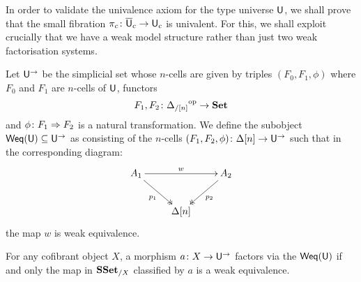 \documentclass[reqno,10pt,a4paper,oneside,draft]{amsart}
\begin{document}
In order to validate the univalence axiom for the type universe $\mathsf{U}$, we shall prove that the small fibration 
$\pi_c \colon \overline{\mathsf{U}}_c \to \mathsf{U}_c$ is univalent. For this, we shall exploit crucially that we have a weak model
structure rather than just two weak factorisation systems.






 Let $\mathsf{U}^{\rightarrow}$ be the simplicial set whose $n$-cells are given by triples $(F_0, F_1, \phi)$ where
 $F_0$ and $F_1$ are $n$-cells of $\mathsf{U}$, \ie functors
 \[
F_1, F_2 \colon {\Delta_{/[n]}}^{\operatorname{op}} \rightarrow \mathbf{Set}
\]
and $\phi \colon F_1 \Rightarrow F_2$ is a natural transformation. We define the subobject $\mathsf{Weq}(\mathsf{U}) \subseteq \mathsf{U}^{\rightarrow}$ as consisting of the 
$n$-cells $(F_1, F_2, \phi) \colon \Delta[n] \rightarrow \mathsf{U}^{\rightarrow}$ such that in the corresponding diagram:
\[
\xymatrix{ 
A_1 \ar[rr]^{w} \ar@{->>}[dr]_{p_1} & & A_2 \ar@{->>}[dl]^{p_2} \\
& \Delta[n] & }
\]
the map $w$ is weak equivalence. 

\begin{proposition}
\label{prop:Weq_classify_Weq}
For any cofibrant object $X$, a morphism $a \colon X \rightarrow \mathsf{U}^{\rightarrow}$ factors via the 
 $\mathsf{Weq}(\mathsf{U})$ if and only the map in $\mathbf{SSet}_{/X}$ classified by $a$ is a weak equivalence.

\end{proposition}
\end{document}
